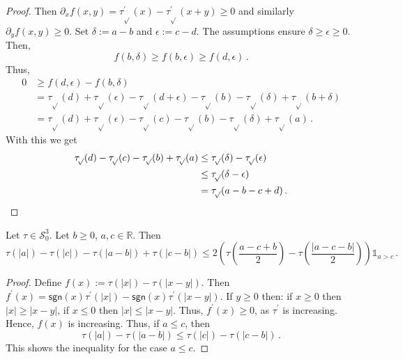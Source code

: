 \documentclass{article}
\newcommand{\lb}{\left(} %
\newcommand{\rb}{\right)} %
\newcommand{\br}[1]{\lb #1 \rb} %
\newcommand{\brOf}[1]{\!\br{#1}} %
\newcommand{\abs}[1]{\left| #1 \right|} %
\newcommand*{\mc}[1]{\mathcal{#1}}
\newcommand{\R}{\mathbb{R}}
\newcommand{\pr}{^\prime}
\newcommand{\sgn}{\mathsf{sgn}} %
\newcommand{\ind}{\mathds{1}}%
\newcommand{\indOf}[1]{\ind_{\!#1}}%
\newcommand{\equationFullstop}{\, .}
\newcommand{\eqfs}{\equationFullstop}
\newcommand{\tran}{\tau}
\newcommand{\trans}{\tran_{\!\sqrt{}}}
\newcommand{\dtrans}{\trans\pr}
\newcommand{\dtran}{\tran\pr}
\newcommand{\setccod}[1]{\mc S_0^{#1}}
\begin{document}
\begin{appendix}
\begin{proof}
	Then $\partial_xf(x,y) = \dtrans(x) - \dtrans(x+y) \geq 0$ and similarly $\partial_yf(x,y) \geq 0$.
	Set $\delta := a-b$ and $\epsilon := c-d$. The assumptions ensure $\delta\geq\epsilon\geq0$.
	Then, 
	\begin{equation*}
		f(b,\delta) \geq f(b,\epsilon) \geq f(d,\epsilon)
		\eqfs
	\end{equation*}
	Thus,
	\begin{align*}
		0 
		&\geq 
		f(d,\epsilon) - f(b,\delta) 
		\\&= 
		\trans(d) + \trans(\epsilon) - \trans(d+\epsilon)
		- \trans(b) - \trans(\delta) + \trans(b+\delta)
		\\&=
		\trans(d) + \trans(\epsilon) - \trans(c)
		- \trans(b) - \trans(\delta) + \trans(a)
		\eqfs
	\end{align*}
	With this we get
	\begin{align*}
		\trans(d) - \trans(c) - \trans(b) + \trans(a)
		&\leq
		\trans(\delta) - \trans(\epsilon)
		\\&\leq 
		\trans(\delta-\epsilon)
		\\&=
		\trans(a-b-c+d)
		\eqfs
		\qedhere
	\end{align*}
\end{proof}%
%
%
%
\begin{lemma}\label{lmm:merging:simple}
	Let $\tran\in\setccod{3}$.
	Let $b\geq0$, $a,c\in\R$.
	Then
	\begin{equation*}
		\tran(|a|) - \tran(|c|) - \tran(|a-b|) + \tran(|c-b|) 
		\leq  
		2 \br{ \tran\brOf{\frac{a - c + b}2} - \tran\brOf{\frac{|a-c - b|}2} } \indOf{a>c}\eqfs
	\end{equation*}
\end{lemma}
%
\begin{proof}
	Define
	$f(x) := \tran(\abs{x}) - \tran(\abs{x - y})$. Then
	$f\pr(x) = \sgn(x)\dtran(\abs{x}) - \sgn(x)\dtran(\abs{x - y})$.
	If $y \geq 0$ then: if $x \geq 0$ then $\abs{x} \geq \abs{x - y}$, if $x \leq 0$ then $\abs{x} \leq \abs{x - y}$.
	Thus, $f\pr(x) \geq 0$, as $\dtran$ is increasing. Hence, $f(x)$ is increasing.
	Thus, if $a\leq c$, then
	\begin{equation*}
		\tran(|a|)-\tran(|a-b|) \leq \tran(|c|) - \tran(|c-b|) 
		\eqfs
	\end{equation*}
	This shows the inequality for the case $a\leq c$.
	

\end{proof}
\end{appendix}
\end{document}
